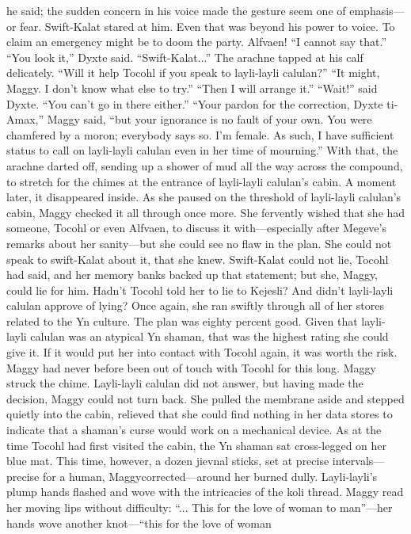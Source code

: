 \documentclass[9pt]{article}
\begin{document}
he said; the sudden concern in his voice made the gesture seem one of emphasis—or fear.
Swift-Kalat stared at him. Even that was beyond his power to voice. To claim an emergency might
be to doom the party. Alfvaen! “I cannot say that.”
“You look it,” Dyxte said.
“Swift-Kalat...” The arachne tapped at his calf delicately. “Will it help Tocohl if you speak to
layli-layli calulan?”
“It might, Maggy. I don’t know what else to try.”
“Then I will arrange it.”
“Wait!” said Dyxte. “You can’t go in there either.”
“Your pardon for the correction, Dyxte ti-Amax,” Maggy said, “but your ignorance is no fault of your
own. You were chamfered by a moron; everybody says so. I’m female. As such, I have sufficient status
to call on layli-layli calulan even in her time of mourning.”
With that, the arachne darted off, sending up a shower of mud all the way across the compound, to
stretch for the chimes at the entrance of layli-layli calulan’s cabin. A moment later, it disappeared
inside.
As she paused on the threshold of layli-layli calulan’s cabin, Maggy checked it all through once
more. She fervently wished that she had someone, Tocohl or even Alfvaen, to discuss it with—especially
after Megeve’s remarks about her sanity—but she could see no flaw in the plan.
She could not speak to swift-Kalat about it, that she knew. Swift-Kalat could not lie, Tocohl had
said, and her memory banks backed up that statement; but she, Maggy, could lie for him. Hadn’t Tocohl
told her to lie to Kejesli? And didn’t layli-layli calulan approve of lying?
Once again, she ran swiftly through all of her stores related to the Yn culture. The plan was eighty
percent good. Given that layli-layli calulan was an atypical Yn shaman, that was the highest rating she
could give it. If it would put her into contact with Tocohl again, it was worth the risk. Maggy had never
before been out of touch with Tocohl for this long.
Maggy struck the chime.
Layli-layli calulan did not answer, but having made the decision, Maggy could not turn back. She
pulled the membrane aside and stepped quietly into the cabin, relieved that she could find nothing in her
data stores to indicate that a shaman’s curse would work on a mechanical device.
As at the time Tocohl had first visited the cabin, the Yn shaman sat cross-legged on her blue mat.
This time, however, a dozen jievnal sticks, set at precise intervals—precise for a human, Maggycorrected—around her burned dully. Layli-layli’s plump hands flashed and wove with the intricacies of
the koli thread. Maggy read her moving lips without difficulty:
“... This for the love of woman to man”—her hands wove another knot—“this for the love of woman
\end{document}
